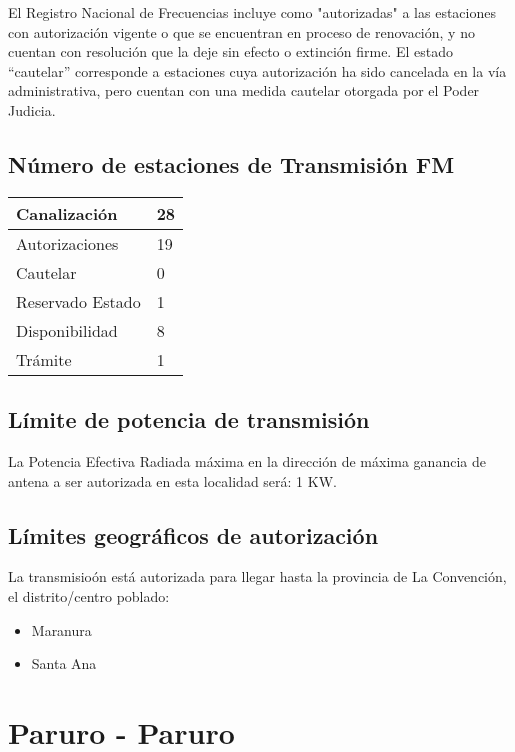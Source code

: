 \documentclass[a4paper]{IEEEtran} %
\begin{document}
El Registro Nacional de Frecuencias incluye como "autorizadas" a las estaciones con autorización vigente o que se encuentran en proceso de renovación, y no cuentan con resolución que la deje sin efecto o extinción firme. El estado “cautelar” corresponde a estaciones cuya autorización ha sido cancelada en la vía administrativa, pero cuentan con una medida cautelar otorgada por el Poder Judicia.

\subsection{Número de estaciones de Transmisión FM}

\begin{tabular}{|l|l|} \hline
	Canalización 			& 28 \\ \hline
	Autorizaciones			& 19 \\ \hline
	Cautelar				& 0 \\ \hline
	Reservado Estado		& 1 \\ \hline
	Disponibilidad			& 8 \\ \hline
	Trámite					& 1 \\ \hline 
\end{tabular}

\subsection{Límite de potencia de transmisión}

La Potencia Efectiva Radiada máxima en la dirección de máxima ganancia de antena a ser autorizada en esta localidad será: 1 KW.

\subsection{Límites geográficos de autorización}

La transmisioón está autorizada para llegar hasta la provincia de La Convención, el distrito/centro poblado:

\begin{itemize}
	\item Maranura
	\item Santa Ana
\end{itemize}



\section{Paruro - Paruro}
\end{document}

